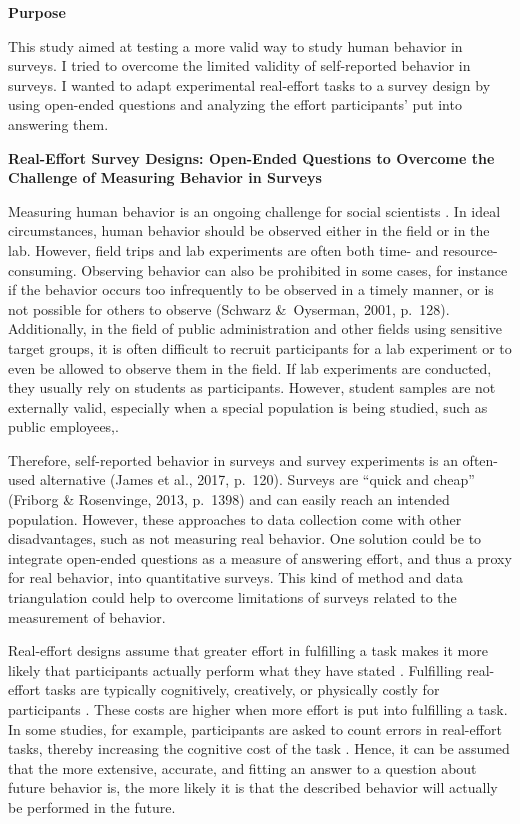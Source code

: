 \documentclass{article}
\begin{document}
\textbf{Purpose}

This study aimed at testing a more valid way to study human behavior in surveys. I tried to overcome the limited validity of self-reported behavior in surveys. I wanted to adapt experimental real-effort tasks to a survey design by using open-ended questions and analyzing the effort participants' put into answering them.

\textbf{}

\textbf{Real-Effort Survey Designs: Open-Ended Questions to Overcome the Challenge of Measuring Behavior in Surveys}

Measuring human behavior is an ongoing challenge for social scientists \parencite{Schwarz2001}. In ideal circumstances, human behavior should be observed either in the field or in the lab. However, field trips and lab experiments are often both time- and resource-consuming. Observing behavior can also be prohibited in some cases, for instance if the behavior occurs too infrequently to be observed in a timely manner, or is not possible for others to observe (Schwarz \& Oyserman, 2001, p. 128). Additionally, in the field of public administration and other fields using sensitive target groups, it is often difficult to recruit participants for a lab experiment or to even be allowed to observe them in the field. If lab experiments are conducted, they usually rely on students as participants. However, student samples are not externally valid, especially when a special population is being studied, such as public employees,. 

Therefore, self-reported behavior in surveys and survey experiments is an often-used alternative (James et al., 2017, p. 120). Surveys are “quick and cheap” (Friborg \& Rosenvinge, 2013, p. 1398) and can easily reach an intended population. However, these approaches to data collection come with other disadvantages, such as not measuring real behavior. One solution could be to integrate open-ended questions as a measure of answering effort, and thus a proxy for real behavior, into quantitative surveys. This kind of method and data triangulation could help to overcome limitations of surveys related to the measurement of behavior. 

Real-effort designs assume that greater effort in fulfilling a task makes it more likely that participants actually perform what they have stated \parencite{Dutcher2015}. Fulfilling real-effort tasks are typically cognitively, creatively, or physically costly for participants \parencite{Charness2018}. These costs are higher when more effort is put into fulfilling a task. In some studies, for example, participants are asked to count errors in real-effort tasks, thereby increasing the cognitive cost of the task \parencite{Andersen2018, Gneezy2006}. Hence, it can be assumed that the more extensive, accurate, and fitting an answer to a question about future behavior is, the more likely it is that the described behavior will actually be performed in the future. 
\end{document}
